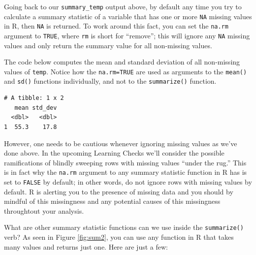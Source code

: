 \documentclass[12pt, krantz2,]{krantz}
\makeatletter
\newenvironment{Shaded}{\begin{snugshade}}{\end{snugshade}}
\newcommand{\DataTypeTok}[1]{\textcolor[rgb]{0.27,0.27,0.27}{#1}}
\newcommand{\KeywordTok}[1]{\textcolor[rgb]{0.27,0.27,0.27}{\textbf{#1}}}
\newcommand{\NormalTok}[1]{#1}
\newcommand{\OperatorTok}[1]{\textcolor[rgb]{0.43,0.43,0.43}{\textbf{#1}}}
\newcommand{\OtherTok}[1]{\textcolor[rgb]{0.37,0.37,0.37}{#1}}
\newcommand{\StringTok}[1]{\textcolor[rgb]{0.5,0.5,0.5}{#1}}
\newenvironment{kframe}{%
\medskip{}
\setlength{\fboxsep}{.8em}
 \def\at@end@of@kframe{}%
 \ifinner\ifhmode%
  \def\at@end@of@kframe{\end{minipage}}%
  \begin{minipage}{\columnwidth}%
 \fi\fi%
 \def\FrameCommand##1{\hskip\@totalleftmargin \hskip-\fboxsep
 \colorbox{shadecolor}{##1}\hskip-\fboxsep
     \hskip-\linewidth \hskip-\@totalleftmargin \hskip\columnwidth}%
 \MakeFramed {\advance\hsize-\width
   \@totalleftmargin\z@ \linewidth\hsize
   \@setminipage}}%
 {\par\unskip\endMakeFramed%
 \at@end@of@kframe}
\renewenvironment{Shaded}{\begin{kframe}}{\end{kframe}}
\makeatother
\begin{document}
Going back to our \texttt{summary\_temp} output above, by default any time you try to calculate a summary statistic of a variable that has one or more \texttt{NA} missing values in R, then \texttt{NA} is returned. To work around this fact, you can set the \texttt{na.rm} argument to \texttt{TRUE}, where \texttt{rm} is short for ``remove''; this will ignore any \texttt{NA} missing values and only return the summary value for all non-missing values.

The code below computes the mean and standard deviation of all non-missing values of \texttt{temp}. Notice how the \texttt{na.rm=TRUE} are used as arguments to the \texttt{mean()} and \texttt{sd()} functions individually, and not to the \texttt{summarize()} function.

\begin{Shaded}
\end{Shaded}

\begin{verbatim}
# A tibble: 1 x 2
   mean std_dev
  <dbl>   <dbl>
1  55.3    17.8
\end{verbatim}

However, one needs to be cautious whenever ignoring missing values as we've done above. In the upcoming Learning Checks we'll consider the possible ramifications of blindly sweeping rows with missing values ``under the rug.'' This is in fact why the \texttt{na.rm} argument to any summary statistic function in R has is set to \texttt{FALSE} by default; in other words, do not ignore rows with missing values by default. R is alerting you to the presence of missing data and you should by mindful of this missingness and any potential causes of this missingness throughtout your analysis.

What are other summary statistic functions can we use inside the \texttt{summarize()} verb? As seen in Figure \ref{fig:sum2}, you can use any function in R that takes many values and returns just one. Here are just a few:
\end{document}

